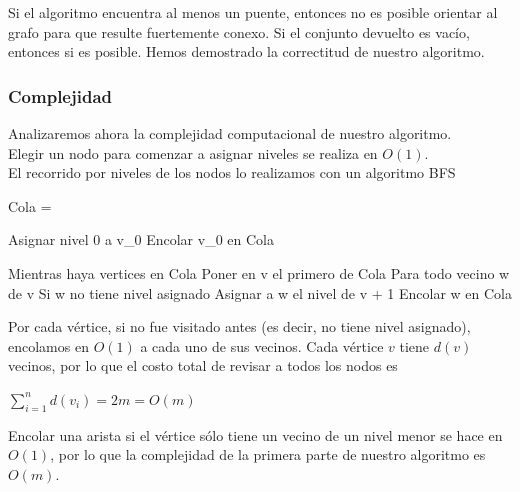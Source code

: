 Si el algoritmo encuentra al menos un puente, entonces no es posible orientar al grafo para que resulte fuertemente conexo. Si el conjunto devuelto es vacío, entonces si es posible. Hemos demostrado 
la correctitud de nuestro algoritmo. \\

\subsubsection{Complejidad}
Analizaremos ahora la complejidad computacional de nuestro algoritmo.\\

Elegir un nodo para comenzar a asignar niveles se realiza en $O(1)$. \\
El recorrido por niveles de los nodos lo realizamos con un algoritmo BFS

\begin{verbatimtab}
Cola 	= {}

Asignar nivel 0 a v_0
Encolar v_0 en Cola

Mientras haya vertices en Cola
{
    Poner en v el primero de Cola
    Para todo vecino w de v
    {
	Si w no tiene nivel asignado
	{
	    Asignar a w el nivel de v + 1
	    Encolar w en Cola
	}
    }
}
\end{verbatimtab}

Por cada vértice, si no fue visitado antes (es decir, no tiene nivel asignado), encolamos en $O(1)$ a cada uno de sus vecinos. Cada vértice $v$ tiene $d(v)$ vecinos, por lo que el costo 
total de revisar a todos los nodos es 
\begin{center}
 $\sum_{i=1}^{n} d(v_i) = 2m = O(m)$
\end{center}
Encolar una arista si el vértice sólo tiene un vecino de un nivel menor se hace en $O(1)$, por lo que la complejidad de la primera parte de nuestro algoritmo es $O(m)$.\\


